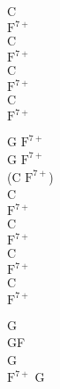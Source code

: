 \begin{chord}
C\\
$\mathrm{F^{7+}}$\\
C\\
$\mathrm{F^{7+}}$\\
C\\
$\mathrm{F^{7+}}$\\
C\\
$\mathrm{F^{7+}}$

G $\mathrm{F^{7+}}$\\
G $\mathrm{F^{7+}}$\\
(C $\mathrm{F^{7+}}$)\\
C\\
$\mathrm{F^{7+}}$\\
C\\
$\mathrm{F^{7+}}$\\
C\\
$\mathrm{F^{7+}}$\\
C\\
$\mathrm{F^{7+}}$

G\\
GF\\
G\\
$\mathrm{F^{7+}}$ G
\end{chord}
